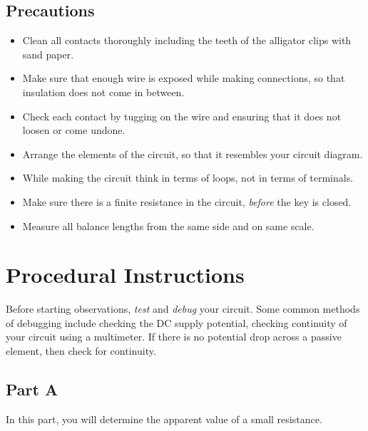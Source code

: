 \subsection*{Precautions}
\begin{itemize}
    \item Clean all contacts thoroughly including %
    the teeth of the alligator clips with sand paper.
    \item Make sure that enough wire is exposed while making connections, so that insulation does not come in between.
    \item Check each contact by tugging on the wire and ensuring that it does not loosen or come undone. 
    \item Arrange the elements of the circuit, so that it resembles your circuit diagram.
    \item While making the circuit think in terms of loops, not in terms of terminals. 
    \item Make sure there is a finite resistance in the circuit, \textit{before} the key is closed.
    \item Measure all balance lengths from the same side and on same scale.
\end{itemize}


\section*{Procedural Instructions}

\begin{imp}
Before starting observations, \textit{test} and \textit{debug} your circuit. Some common methods of debugging include checking the DC supply potential, checking continuity of your circuit using a multimeter. If there is no potential drop across a passive element, then check for continuity.
\end{imp}


\subsection*{Part A}

In this part, you will determine the apparent value of a small resistance.

